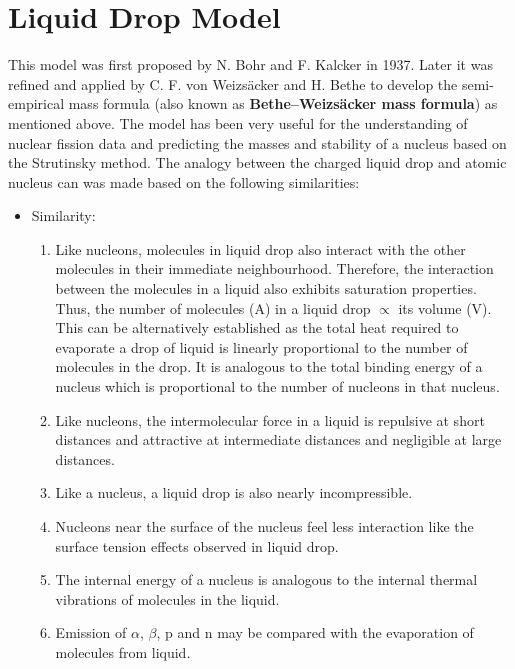\documentclass[ebook,12pt,oneside,openany]{memoir}
\begin{document}
\section{Liquid Drop Model}
This model was first proposed by N. Bohr and F. Kalcker in 1937. Later it was refined and applied by C. F. von Weizsäcker and H. Bethe to develop the semi-empirical mass formula (also known as \textbf{Bethe–Weizsäcker mass formula}) as mentioned above.  The model has been very useful for the understanding of nuclear fission data and predicting the masses and stability of a nucleus based on the Strutinsky method. The analogy between the charged liquid drop and atomic nucleus can was made based on the following similarities:

    \begin{itemize}
    
        \item Similarity:
        
            \begin{enumerate}
                \item Like nucleons, molecules in liquid drop also interact with the other molecules in their immediate neighbourhood. Therefore, the interaction between the molecules in a liquid also exhibits saturation properties. Thus, the number of molecules (A) in a liquid drop $\propto$ its volume (V). This can be alternatively established as the total heat required to evaporate a drop of liquid is linearly proportional to the number of molecules in the drop. It is analogous to the total binding energy of a nucleus which is proportional to the number of nucleons in that nucleus.
                \item Like nucleons, the intermolecular force in a liquid is repulsive at short distances and attractive at intermediate distances and negligible at large distances.
                \item Like a nucleus, a liquid drop is also nearly incompressible.
                \item Nucleons near the surface of the nucleus feel less interaction like the surface tension effects observed in liquid drop.
                \item The internal energy of a nucleus is analogous to the internal thermal vibrations of molecules in the liquid.
                \item Emission of $\alpha$, $\beta$, p and n may be compared with the evaporation of molecules from liquid.
            \end{enumerate}
        

\end{itemize}
\end{document}
